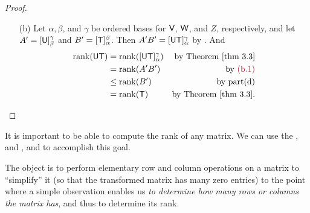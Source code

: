 \begin{proof}
\begin{enumerate}
\item[(b)] Let \(\alpha, \beta\), and \(\gamma\) be ordered bases for \(\textsf{V}\), \(\textsf{W}\), and \(Z\), respectively,
and let \(A' = [\textsf{U}]_{\beta}^{\gamma}\) and \(B' = [\textsf{T}]_{\alpha}^{\beta}\).
Then \(A'B' = [\textsf{U}\textsf{T}]_{\alpha}^{\gamma}\)  by .
And 
\begin{align*}
    \rank(\U\T) & = \rank([\U\T]_{\alpha}^{\gamma}) & \text{by \THM{3.3}} \\
                & = \rank(A' B') & \text{by \MAROON{(b.1)}} \\
                & \le \rank(B') & \text{by part(d)} \\
                & = \rank(\T) & \text{by \THM{3.3}}.
\end{align*}
\end{enumerate}
\end{proof}

\begin{remark} \label{remark 3.2.5}
It is important to be able to compute the rank of any matrix.
We can use the ,  and , and  to accomplish this goal.

The object is to perform elementary row and column operations on a matrix to ``simplify'' it
(so that the transformed matrix has many zero entries)
to the point where a simple observation enables us \emph{to determine how many \LID{} rows or columns the matrix has}, and thus to determine its rank.
\end{remark}

